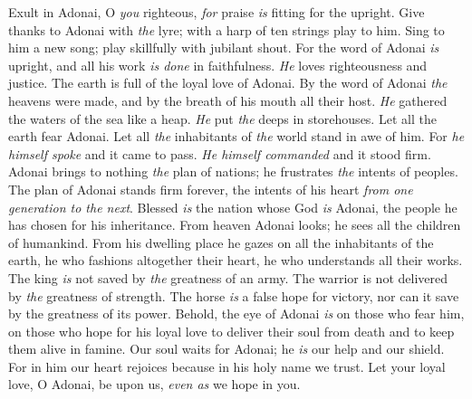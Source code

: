 \begin{biblechapter} %
 Exult in Adonai, O \textit{you} righteous, 
\textit{for} praise \textit{is} fitting for the upright.
\verse Give thanks to Adonai with \textit{the} lyre; 
with a harp of ten strings play to him.
\verse Sing to him a new song; 
play skillfully with jubilant shout.
\verse For the word of Adonai \textit{is} upright, 
and all his work \textit{is done} in faithfulness.
\verse \textit{He} loves righteousness and justice. 
The earth is full of the loyal love of Adonai.
\verse By the word of Adonai \textit{the} heavens were made, 
and by the breath of his mouth all their host.
\verse \textit{He} gathered the waters of the sea like a heap. 
\textit{He} put \textit{the} deeps in storehouses.
\verse Let all the earth fear Adonai. 
Let all \textit{the} inhabitants of \textit{the} world stand in awe of him.
\verse For \textit{he himself spoke} and it came to pass. 
\textit{He himself commanded} and it stood firm.
\verse Adonai brings to nothing \textit{the} plan of nations; 
he frustrates \textit{the} intents of peoples.
\verse The plan of Adonai stands firm forever, 
the intents of his heart \textit{from one generation to the next}.
\verse Blessed \textit{is} the nation whose God \textit{is} Adonai, 
the people he has chosen for his inheritance.
\verse From heaven Adonai looks; 
he sees all the children of humankind.
\verse From his dwelling place he gazes 
on all the inhabitants of the earth,
\verse he who fashions altogether their heart, 
he who understands all their works.
\verse The king \textit{is} not saved by \textit{the} greatness of an army. 
The warrior is not delivered by \textit{the} greatness of strength.
\verse The horse \textit{is} a false hope for victory, 
nor can it save by the greatness of its power.
\verse Behold, the eye of Adonai \textit{is} on those who fear him, 
on those who hope for his loyal love
\verse to deliver their soul from death 
and to keep them alive in famine.
\verse Our soul waits for Adonai; 
he \textit{is} our help and our shield.
\verse For in him our heart rejoices 
because in his holy name we trust.
\verse Let your loyal love, O Adonai, be upon us, 
\textit{even as} we hope in you.
\end{biblechapter}


